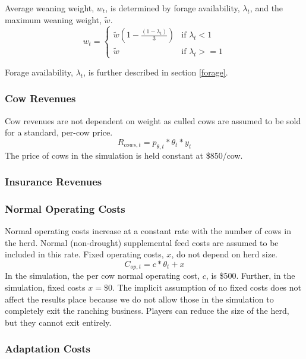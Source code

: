 \documentclass[11pt]{article}
\begin{document}
Average weaning weight, $w_t$, is determined by forage availability, $\lambda_t$, and the maximum weaning weight, $\tilde{w}$.
\begin{equation} \label{calfdroughtweight}
w_{t} = 
\begin{cases}
\tilde{w} \left(1 - \frac{(1 - \lambda_t)}{3}\right) & \text{if } \lambda_t < 1 \\
\tilde{w} & \text{if } \lambda_t >= 1
\end{cases}
\end{equation}

Forage availability, $\lambda_t$, is further described in section \ref{forage}.

\subsubsection{Cow Revenues}
Cow revenues are not dependent on weight as culled cows are assumed to be sold for a standard, per-cow price.
\begin{equation}
R_{cows,t} = p_{\theta,t} * \theta_t * y_t 
\end{equation}
The price of cows in the simulation is held constant at \$850/cow.

\subsubsection{Insurance Revenues}

\subsubsection{Normal Operating Costs}
Normal operating costs increase at a constant rate with the number of cows in the herd. Normal (non-drought) supplemental feed costs are assumed to be included in this rate. Fixed operating costs, $x$, do not depend on herd size.
\begin{equation}
C_{op,t} = c * \theta_t + x
\end{equation}
In the simulation, the per cow normal operating cost, $c$, is \$500. Further, in the simulation, fixed costs $x = \$0$. The implicit assumption of no fixed costs does not affect the results place because we do not allow those in the simulation to completely exit the ranching business. Players can reduce the size of the herd, but they cannot exit entirely.

\subsubsection{Adaptation Costs}
\end{document}
